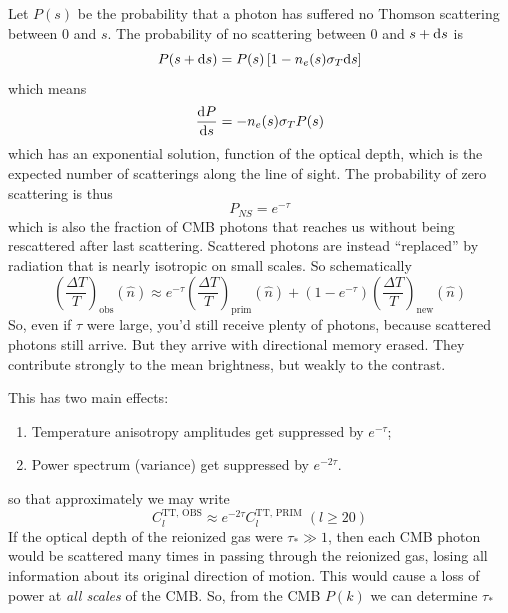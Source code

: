 \par Let $P(s)$ be the probability that a photon has suffered no Thomson scattering between 0 and $s$. The probability of no scattering between 0 and $s+\text{d}s$ is
\begin{equation*}
    P(s+\text{d}s) = P(s)\left[1-n_{e}(s)\sigma_{T}\text{d}s\right]
\end{equation*}
which means 
\begin{equation}
    \frac{\text{d}P}{\text{d}s} = -n_{e}(s)\sigma_{T}P(s)
    \label{eq:thomsonprob}
\end{equation}
which has an exponential solution, function of the optical depth, which is the expected number of scatterings along the line of sight. The probability of zero scattering is thus 
\begin{equation*}
    P_{NS} = e^{-\tau}
\end{equation*}
which is also the fraction of CMB photons that reaches us without being rescattered after last scattering. Scattered photons are instead “replaced” by radiation that is nearly isotropic on small scales. So schematically
\begin{equation*}
    \left(\frac{\Delta T}{T}\right)_{\text{obs}}(\hat{n}) \approx e^{-\tau}\left(\frac{\Delta T}{T}\right)_{\text{prim}}(\hat{n}) + (1-e^{-\tau})\left(\frac{\Delta T}{T}\right)_{\text{new}}(\hat{n})
\end{equation*}
So, even if $\tau$ were large, you'd still receive plenty of photons, because scattered photons still arrive. But they arrive with directional memory erased. They contribute strongly to the mean brightness, but weakly to the contrast.
\par This has two main effects:
\begin{enumerate}
    \item Temperature anisotropy amplitudes get suppressed by $e^{-\tau}$;
    \item Power spectrum (variance) get suppressed by $e^{-2\tau}$.
\end{enumerate}
so that approximately we may write 
\begin{equation*}
    C_{l}^{\text{TT, OBS}} \approx e^{-2\tau} C_{l}^{\text{TT, PRIM}}\; (l\geq 20)
\end{equation*}
If the optical depth of the reionized gas were $\tau_{*} \gg 1$, then each CMB photon would be scattered many times in passing through the reionized gas, losing all information about its original direction of motion. This would cause a loss of power at \emph{all scales} of the CMB. So, from the CMB $P(k)$ we can determine $\tau_{*}$
